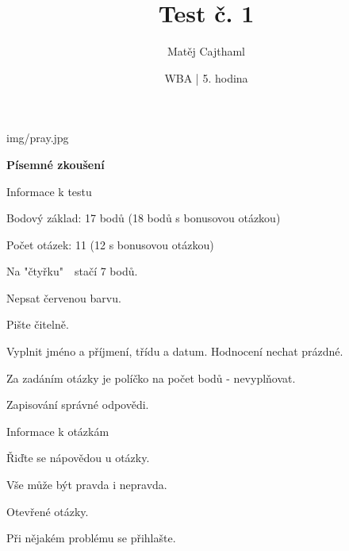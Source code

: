 \documentclass[aspectratio=169]{beamer}
\title{Test č. 1}
\date{WBA | 5. hodina}
\author[Cajthaml]{Matěj Cajthaml}
\begin{document}
\begin{frame}
\titlepage
\end{frame}




\begin{frameImg}[width]{img/pray.jpg}
    \vspace*{60mm}
    \begin{cardTiny}
        \vspace*{\fill}
        \begin{center}
            \textbf{Písemné zkoušení}
        \end{center}
    \end{cardTiny}
\end{frameImg}


\begin{frame}{Informace k testu}
    \begin{cardTiny}
        \begin{flushleft}
            Bodový základ: 17 bodů (18 bodů s bonusovou otázkou)

            Počet otázek: 11 (12 s bonusovou otázkou)

            Na "čtyřku"~~stačí 7 bodů.

            \vspace{2ex}

            Nepsat červenou barvu.

            Pište čitelně.

            \vspace{2ex}

            Vyplnit jméno a příjmení, třídu a datum. Hodnocení nechat prázdné.

            Za zadáním otázky je políčko na počet bodů - nevyplňovat.

            \vspace{2ex}
            Zapisování správné odpovědi.
        \end{flushleft}
    \end{cardTiny}
\end{frame}

\begin{frame}{Informace k otázkám}
    \begin{cardTiny}
        \begin{flushleft}
            Řiďte se nápovědou u otázky.

            Vše může být pravda i nepravda.  

            Otevřené otázky.
        \end{flushleft}
    \end{cardTiny}

    \begin{cardTiny}
        \begin{flushleft}
            Při nějakém problému se přihlašte.
        \end{flushleft}
    \end{cardTiny}
\end{frame}
\end{document}

